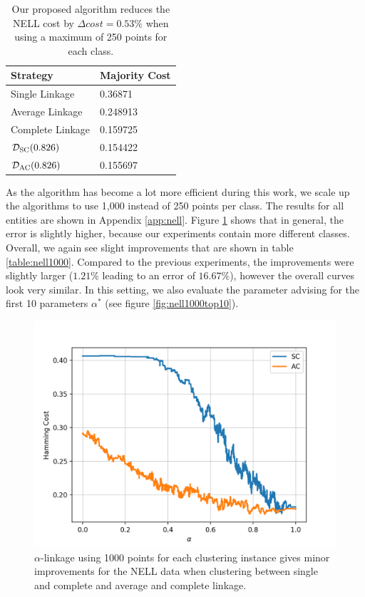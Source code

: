 \begin{table}[h]
    \centering
    \begin{tabular}{|l | l|}
    \hline
    Strategy & Majority Cost\\ \hline
    Single Linkage & 0.36871\\
    Average Linkage & 0.248913\\
    Complete Linkage & 0.159725\\
    $\mathcal{D}_\text{SC}(0.826)$ & 0.154422\\
    $\mathcal{D}_\text{AC}(0.826)$ & 0.155697\\\hline
    \end{tabular}
    \caption{Our proposed algorithm reduces the NELL cost by $\Delta cost = 0.53\%$ when using a maximum of 250 points for each class.}
    \label{table:nellresults}
\end{table}

As the algorithm has become a lot more efficient during this work, we scale up the algorithms to use 1,000 instead of 250 points per class. The results for all entities are shown in Appendix \ref{app:nell}. Figure \ref{fig:nellresults1000} shows that in general, the error is slightly higher, because our experiments contain more different classes. Overall, we again see slight improvements that are shown in table \ref{table:nell1000}. Compared to the previous experiments, the improvements were slightly larger ($1.21\%$ leading to an error of $16.67\%$), however the overall curves look very similar. In this setting, we also evaluate the parameter advising for the first 10 parameters $\alpha^*$ (see figure \ref{fig:nell1000top10}).

\begin{figure}[h]
\centering
  \includegraphics[width=.5\linewidth]{plots/nell_1000}
\caption{$\alpha$-linkage using 1000 points for each clustering instance gives minor improvements for the NELL data when clustering between single and complete and average and complete linkage.}
\label{fig:nellresults1000}
\end{figure}

